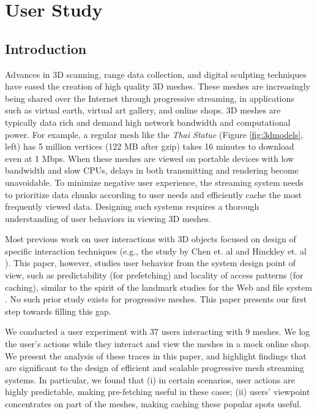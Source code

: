 \chapter{User Study}
\section{Introduction}

Advances in 3D scanning, range data collection, and digital sculpting techniques have 
eased the creation of high quality 3D meshes.
These meshes are increasingly being shared over the Internet through progressive streaming, in applications such as virtual earth, virtual art gallery, and online shops.  
3D meshes are typically data rich and demand high network bandwidth and
computational power. For example, a regular mesh like the \textit{Thai Statue} (Figure \ref{fig:3dmodels}, left) has 5 million vertices (122 MB after gzip) takes 16 minutes to download even at 1 Mbps.  When these meshes are 
viewed on portable devices with
low bandwidth and slow CPUs, delays in both transmitting and
rendering become unavoidable. To minimize negative user experience, the
streaming system needs to prioritize data chunks according to user needs and
efficiently cache the most frequently viewed data.  Designing such
systems requires a thorough understanding of user behaviors in viewing 3D
meshes.

Most previous work on user interactions with 3D objects
focused on design of specific interaction
techniques
(e.g., the study by Chen et. al \cite{chen88study} and Hinckley et. al \cite{hinckley97usability}). 
This paper, however, studies
user behavior from the system design point of view, 
such as predictability (for prefetching) and locality of access patterns (for caching),
similar to the spirit of the landmark studies for the Web \cite{huberman98web} and file system \cite{ousterhout85trace}.  No such prior study exists for progressive meshes.  This paper presents our first step towards filling 
this gap.

We conducted 
a user experiment with 37 users interacting with 9 meshes.
We log the user's actions while they interact and view the meshes in a mock online shop.  We present the analysis of these traces in this paper, and highlight findings that are significant to the design of efficient and scalable progressive mesh streaming systems.  In particular, we found that (i) in certain scenarios, user actions are highly predictable, making pre-fetching useful in these cases; (ii) users' viewpoint concentrates on part of the meshes, making caching these popular spots useful. %


